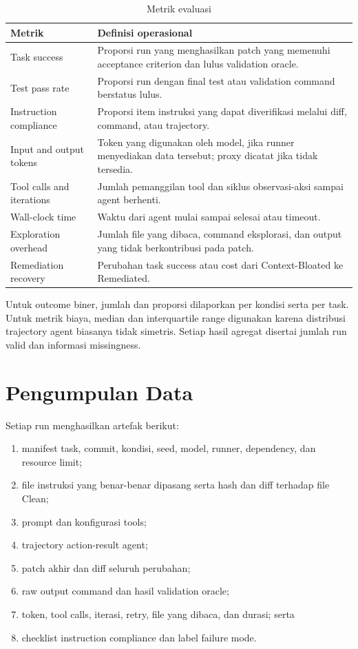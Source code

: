 \begin{table}[htbp]
\centering
\small
\renewcommand{\arraystretch}{1.25}
\caption{Metrik evaluasi}
\label{tab:metrics}
\begin{tabularx}{\textwidth}{p{3.8cm}Y}
\toprule
\textbf{Metrik} & \textbf{Definisi operasional} \\
\midrule
Task success & Proporsi run yang menghasilkan patch yang memenuhi acceptance criterion dan lulus validation oracle. \\
Test pass rate & Proporsi run dengan final test atau validation command berstatus lulus. \\
Instruction compliance & Proporsi item instruksi yang dapat diverifikasi melalui diff, command, atau trajectory. \\
Input and output tokens & Token yang digunakan oleh model, jika runner menyediakan data tersebut; proxy dicatat jika tidak tersedia. \\
Tool calls and iterations & Jumlah pemanggilan tool dan siklus observasi-aksi sampai agent berhenti. \\
Wall-clock time & Waktu dari agent mulai sampai selesai atau timeout. \\
Exploration overhead & Jumlah file yang dibaca, command eksplorasi, dan output yang tidak berkontribusi pada patch. \\
Remediation recovery & Perubahan task success atau cost dari Context-Bloated ke Remediated. \\
\bottomrule
\end{tabularx}
\end{table}

Untuk outcome biner, jumlah dan proporsi dilaporkan per kondisi serta per task. Untuk metrik biaya, median dan interquartile range digunakan karena distribusi trajectory agent biasanya tidak simetris. Setiap hasil agregat disertai jumlah run valid dan informasi missingness.

\section{Pengumpulan Data}

Setiap run menghasilkan artefak berikut:

\begin{enumerate}[leftmargin=*]
    \item manifest task, commit, kondisi, seed, model, runner, dependency, dan resource limit;
    \item file instruksi yang benar-benar dipasang serta hash dan diff terhadap file Clean;
    \item prompt dan konfigurasi tools;
    \item trajectory action-result agent;
    \item patch akhir dan diff seluruh perubahan;
    \item raw output command dan hasil validation oracle;
    \item token, tool calls, iterasi, retry, file yang dibaca, dan durasi; serta
    \item checklist instruction compliance dan label failure mode.
\end{enumerate}

